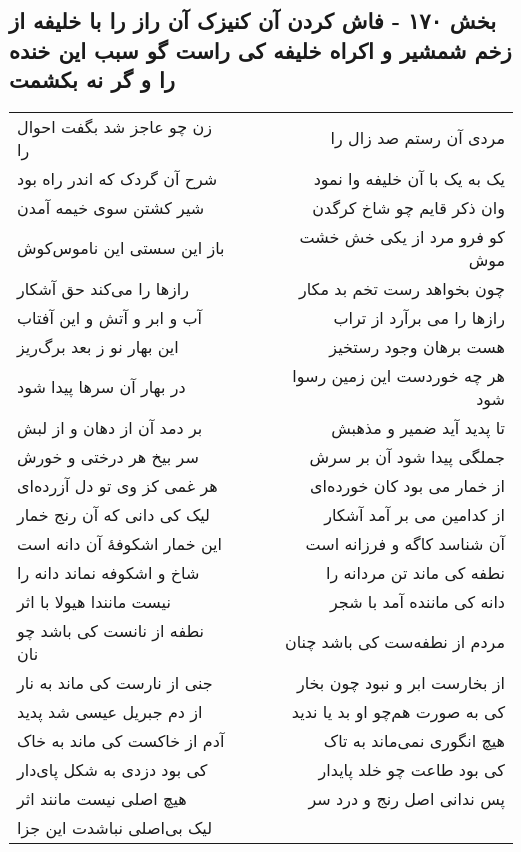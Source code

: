 \begin{center}
\section*{بخش ۱۷۰ - فاش کردن آن کنیزک آن راز را با خلیفه از زخم شمشیر و اکراه خلیفه کی راست گو سبب این خنده را و گر نه بکشمت}
\label{sec:sh170}
\begin{longtable}{l p{0.5cm} r}
زن چو عاجز شد بگفت احوال را
&&
مردی آن رستم صد زال را
\\
شرح آن گردک که اندر راه بود
&&
یک به یک با آن خلیفه وا نمود
\\
شیر کشتن سوی خیمه آمدن
&&
وان ذکر قایم چو شاخ کرگدن
\\
باز این سستی این ناموس‌کوش
&&
کو فرو مرد از یکی خش خشت موش
\\
رازها را می‌کند حق آشکار
&&
چون بخواهد رست تخم بد مکار
\\
آب و ابر و آتش و این آفتاب
&&
رازها را می برآرد از تراب
\\
این بهار نو ز بعد برگ‌ریز
&&
هست برهان وجود رستخیز
\\
در بهار آن سرها پیدا شود
&&
هر چه خوردست این زمین رسوا شود
\\
بر دمد آن از دهان و از لبش
&&
تا پدید آید ضمیر و مذهبش
\\
سر بیخ هر درختی و خورش
&&
جملگی پیدا شود آن بر سرش
\\
هر غمی کز وی تو دل آزرده‌ای
&&
از خمار می بود کان خورده‌ای
\\
لیک کی دانی که آن رنج خمار
&&
از کدامین می بر آمد آشکار
\\
این خمار اشکوفهٔ آن دانه است
&&
آن شناسد کاگه و فرزانه است
\\
شاخ و اشکوفه نماند دانه را
&&
نطفه کی ماند تن مردانه را
\\
نیست مانندا هیولا با اثر
&&
دانه کی ماننده آمد با شجر
\\
نطفه از نانست کی باشد چو نان
&&
مردم از نطفه‌ست کی باشد چنان
\\
جنی از نارست کی ماند به نار
&&
از بخارست ابر و نبود چون بخار
\\
از دم جبریل عیسی شد پدید
&&
کی به صورت هم‌چو او بد یا ندید
\\
آدم از خاکست کی ماند به خاک
&&
هیچ انگوری نمی‌ماند به تاک
\\
کی بود دزدی به شکل پای‌دار
&&
کی بود طاعت چو خلد پایدار
\\
هیچ اصلی نیست مانند اثر
&&
پس ندانی اصل رنج و درد سر
\\
لیک بی‌اصلی نباشدت این جزا
&&

\end{longtable}
\end{center}
